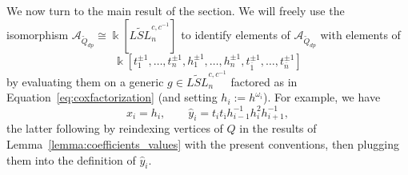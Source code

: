 \documentclass[12pt]{amsart}
\newcommand{\cA}{\mathcal{A}}
\newcommand{\kk}{\Bbbk}
\newcommand{\ol}[1]{\overline{#1}}
\newcommand{\Qdp}{\widetilde{Q}_{dp}}
\theoremstyle{remark}
\numberwithin{equation}{section}
\numberwithin{figure}{section}
\begin{document}
We now turn to the main result of the section.
We will freely use the isomorphism $\cA_{\Qdp} \cong \kk[\widetilde{LSL}_n^{c,c^{-1}}]$ to identify elements of $\cA_{\Qdp}$ with elements of 
\[
  \kk[t_{1}^{\pm1},\dotsc,t_{n}^{\pm 1},h_1^{\pm 1},\dotsc,h_{n}^{\pm 1},t_{\ol{1}}^{\pm 1},\dotsc,t_{\ol{n}}^{\pm 1}]
\]
by evaluating them on a generic $g \in \widetilde{LSL}_n^{c,c^{-1}}$ factored as in Equation~\ref{eq:coxfactorization} (and setting $h_i := h^{\omega_i}$).
For example, we have 
\begin{equation}
  \label{eq:typeAyhat}
  x_i = h_i,\quad\quad \hat{y}_i = t_it_{\ol{\imath}}h_{i-1}^{-1}h_i^2h_{i+1}^{-1},
\end{equation}
the latter following by reindexing vertices of $Q$ in the results of Lemma~\ref{lemma:coefficients_values} with the present conventions, then plugging them into the definition of $\hat{y}_i$.
\end{document}
